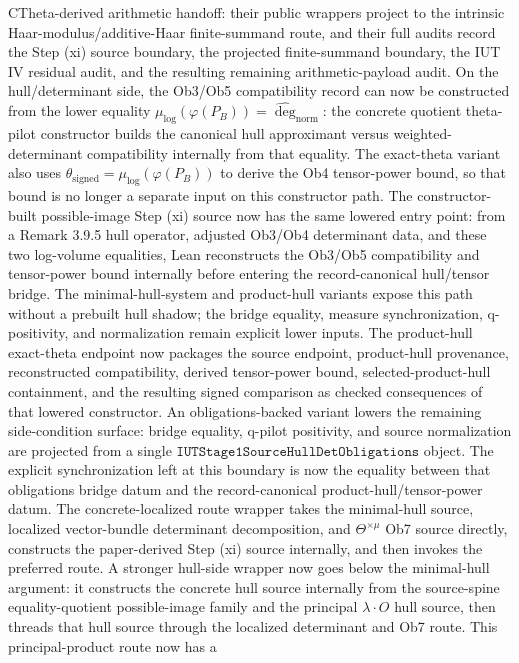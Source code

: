 \documentclass[11pt]{article}
\theoremstyle{plain}
\theoremstyle{definition}
\theoremstyle{remark}
\begin{document}
CTheta-derived arithmetic handoff: their public wrappers project to the
intrinsic Haar-modulus/additive-Haar finite-summand route, and their full
audits record the Step (xi) source boundary, the projected finite-summand
boundary, the IUT IV residual audit, and the resulting remaining
arithmetic-payload audit.
On the hull/determinant side, the Ob3/Ob5 compatibility record can now be
constructed from the lower equality
\(\mu_{\log}(\varphi(P_B))=\widehat{\deg}_{\mathrm{norm}}\): the concrete
quotient theta-pilot constructor builds the canonical hull approximant versus
weighted-determinant compatibility internally from that equality.
The exact-theta variant also uses
\(\theta_{\mathrm{signed}}=\mu_{\log}(\varphi(P_B))\) to derive the Ob4
tensor-power bound, so that bound is no longer a separate input on this
constructor path.
The constructor-built possible-image Step (xi) source now has the same lowered
entry point: from a Remark 3.9.5 hull operator, adjusted Ob3/Ob4 determinant
data, and these two log-volume equalities, Lean reconstructs the Ob3/Ob5
compatibility and tensor-power bound internally before entering the
record-canonical hull/tensor bridge.  The minimal-hull-system and product-hull
variants expose this path without a prebuilt hull shadow; the bridge equality,
measure synchronization, q-positivity, and normalization remain explicit lower
inputs.  The product-hull exact-theta endpoint now packages the source endpoint,
product-hull provenance, reconstructed compatibility, derived tensor-power
bound, selected-product-hull containment, and the resulting signed comparison
as checked consequences of that lowered constructor.  An obligations-backed
variant lowers the remaining side-condition surface: bridge equality, q-pilot
positivity, and source normalization are projected from a single
\(\texttt{IUTStage1SourceHullDetObligations}\) object.  The explicit
synchronization left at this boundary is now the equality between that
obligations bridge datum and the record-canonical product-hull/tensor-power
datum.
The concrete-localized route wrapper takes the minimal-hull source, localized vector-bundle
determinant decomposition, and \(\Theta^{\times\mu}\) Ob7 source directly,
constructs the paper-derived Step (xi) source internally, and then invokes the
preferred route.  A stronger hull-side wrapper now goes below the minimal-hull
argument: it constructs the concrete hull source internally from the
source-spine equality-quotient possible-image family and the principal
\(\lambda\cdot O\) hull source, then threads that hull source through the
localized determinant and Ob7 route.  This principal-product route now has a
\end{document}
